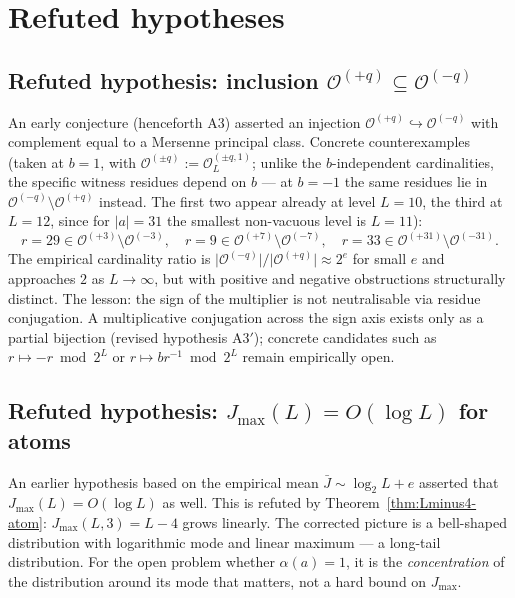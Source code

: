 \documentclass[11pt,reqno]{amsart}
\theoremstyle{plain}
\theoremstyle{definition}
\theoremstyle{remark}
\newcommand{\Obs}{\mathcal{O}}
\begin{document}
\appendix
\section{Refuted hypotheses}\label{sec:errata}

\subsection{Refuted hypothesis: inclusion \texorpdfstring{$\Obs^{(+q)} \subseteq \Obs^{(-q)}$}{O(+q) subset O(-q)}}\label{sec:err-A3}

An early conjecture (henceforth A3) asserted an injection
$\Obs^{(+q)} \hookrightarrow \Obs^{(-q)}$ with complement equal to a
Mersenne principal class. Concrete counterexamples (taken at $b = 1$, with
$\Obs^{(\pm q)} := \Obs_L^{(\pm q, 1)}$; unlike the $b$-independent
cardinalities, the specific witness residues depend on $b$ --- at $b = -1$
the same residues lie in $\Obs^{(-q)} \setminus \Obs^{(+q)}$ instead. The
first two appear already at level $L = 10$, the third at $L = 12$, since
for $\lvert a \rvert = 31$ the smallest non-vacuous level is $L = 11$):
\[
r = 29 \in \Obs^{(+3)} \setminus \Obs^{(-3)},
\quad
r = 9 \in \Obs^{(+7)} \setminus \Obs^{(-7)},
\quad
r = 33 \in \Obs^{(+31)} \setminus \Obs^{(-31)}.
\]
The empirical cardinality ratio is $\lvert \Obs^{(-q)} \rvert /
\lvert \Obs^{(+q)} \rvert \approx 2^e$ for small $e$ and approaches $2$
as $L \to \infty$, but with positive and negative obstructions
structurally distinct. The lesson: the sign of the multiplier is not
neutralisable via residue conjugation. A multiplicative conjugation
across the sign axis exists only as a partial bijection (revised
hypothesis A3$'$); concrete candidates such as $r \mapsto -r \bmod 2^L$
or $r \mapsto b r^{-1} \bmod 2^L$ remain empirically open.

\subsection{Refuted hypothesis: \texorpdfstring{$J_{\max}(L) = O(\log L)$}{Jmax(L) = O(log L)} for atoms}\label{sec:err-Jmax}

An earlier hypothesis based on the empirical mean $\bar J \sim \log_2 L
+ e$ asserted that $J_{\max}(L) = O(\log L)$ as well. This is refuted by
Theorem~\ref{thm:Lminus4-atom}: $J_{\max}(L, 3) = L - 4$ grows linearly.
The corrected picture is a bell-shaped distribution with logarithmic mode
and linear maximum --- a long-tail distribution. For the open problem
whether $\alpha(a) = 1$, it is the \emph{concentration} of the
distribution around its mode that matters, not a hard bound on $J_{\max}$.



\end{document}
